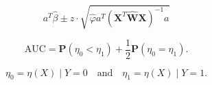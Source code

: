 \[
  a^T\hat{\beta}
  \pm z \cdot \sqrt{\hat{\varphi} a^T(\mathbf{X}^T\hat{\mathbf{W}}\mathbf{X})^{-1}a}
\]

\[
  \mathrm{AUC} = \mathbf{P}(\eta_0 < \eta_1)
                 + \frac{1}{2} \mathbf{P}(\eta_0 = \eta_1).
\]

\[
  \eta_0 = \eta(X) \mid Y = 0 \quad \text{and} \quad \eta_1 = \eta(X) \mid Y = 1.
\]
